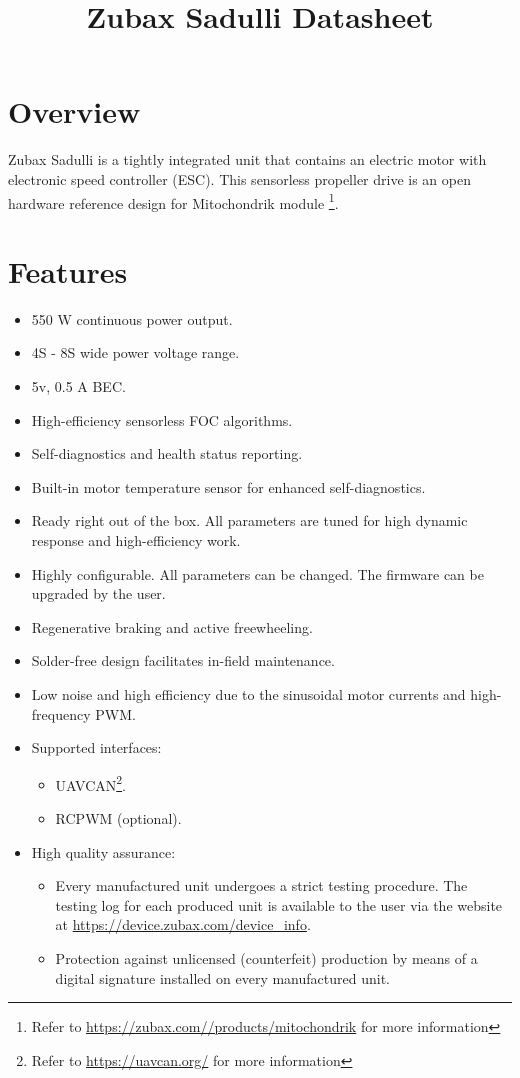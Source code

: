 \documentclass{zubaxdoc}
\title{Zubax Sadulli Datasheet}
\begin{document}
\frontmatter
\begin{titlepage}
\section*{Overview}
Zubax Sadulli is a tightly integrated unit that contains an electric motor with electronic speed controller (ESC). 
This sensorless propeller drive is an open hardware reference design for Mitochondrik module
\footnote{Refer to \url{https://zubax.com//products/mitochondrik} for more information}.
\section*{Features}

\begin{itemize}
    \item 550 W continuous power output.
    \item 4S - 8S wide power voltage range.
    \item 5v, 0.5 A BEC.
    \item High-efficiency sensorless FOC algorithms.
    \item Self-diagnostics and health status reporting.
    \item Built-in motor temperature sensor for enhanced \allowbreak{}self-diagnostics.
    \item Ready right out of the box. All parameters are tuned for high dynamic response and high-efficiency work.      
    \item Highly configurable. All parameters can be changed. The firmware can be upgraded by the user.     
    \item Regenerative braking and active freewheeling. 
    \item Solder-free design facilitates in-field maintenance.
    \item Low noise and high efficiency due to the sinusoidal motor currents and \allowbreak{}high-frequency PWM.
    \item Supported interfaces:
    \begin{itemize}
        \item UAVCAN\footnote{Refer to \url{https://uavcan.org/} for more information}.
        \item RCPWM (optional).
    \end{itemize}
    \item High quality assurance:
    \begin{itemize}
        \item Every manufactured unit undergoes a strict testing procedure.
        The testing log for each produced unit is available to the user via the website at
        \url{https://device.zubax.com/device_info}.
        \item Protection against unlicensed (counterfeit) production by means of a digital signature installed on 
        every manufactured unit.
     \end{itemize}
\end{itemize}


\end{titlepage}
\end{document}
